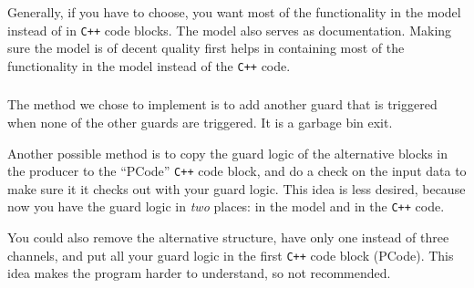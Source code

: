 \documentclass[a4paper,twoside,11pt]{article}
\newcommand{\cpp}{{\tt C++} }
\begin{document}
Generally, if you have to choose, you want most of the functionality in the model instead of in \cpp code blocks.
The model also serves as documentation. Making sure the model is of decent quality first helps in containing most of the functionality in the model instead of the \cpp code.

\subsubsection{}
The method we chose to implement is to add another guard that is triggered when none of the other guards are triggered. It is a garbage bin exit.
\smallskip

Another possible method is to copy the guard logic of the alternative blocks in the producer to the ``PCode'' \cpp code block, 
and do a check on the input data to make sure it it checks out with your guard logic.
This idea is less desired, because now you have the guard logic in \emph{two} places: in the model and in the \cpp code.

You could also remove the alternative structure, have only one instead of three channels, and put all your guard logic in the first \cpp code block (PCode).
This idea makes the program harder to understand, so not recommended.
\end{document}
